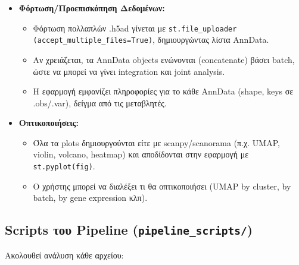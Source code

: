 \documentclass[12pt, a4paper]{article}
\begin{document}
\begin{itemize}
\begin{itemize}
    \end{itemize}
    \item \textbf{Φόρτωση/Προεπισκόπηση Δεδομένων:}
    \begin{itemize}
        \item Φόρτωση πολλαπλών .h5ad γίνεται με \texttt{st.file\_uploader (accept\_multiple\_files=True)}, δημιουργώντας λίστα AnnData.
        \item Αν χρειάζεται, τα AnnData objects ενώνονται (concatenate) βάσει batch, ώστε να μπορεί να γίνει integration και joint analysis.
        \item Η εφαρμογή εμφανίζει πληροφορίες για το κάθε AnnData (shape, keys σε .obs/.var), δείγμα από τις μεταβλητές.
    \end{itemize}
    \item \textbf{Οπτικοποιήσεις:}
    \begin{itemize}
        \item Όλα τα plots δημιουργούνται είτε με scanpy/scanorama (π.χ. UMAP, violin, volcano, heatmap) και αποδίδονται στην εφαρμογή με \texttt{st.pyplot(fig)}.
        \item Ο χρήστης μπορεί να διαλέξει τι θα οπτικοποιήσει (UMAP by cluster, by batch, by gene expression κλπ).
    \end{itemize}
\end{itemize}

\subsection{Scripts του Pipeline (\texttt{pipeline\_scripts/})}
Ακολουθεί ανάλυση κάθε αρχείου:
\end{document}
